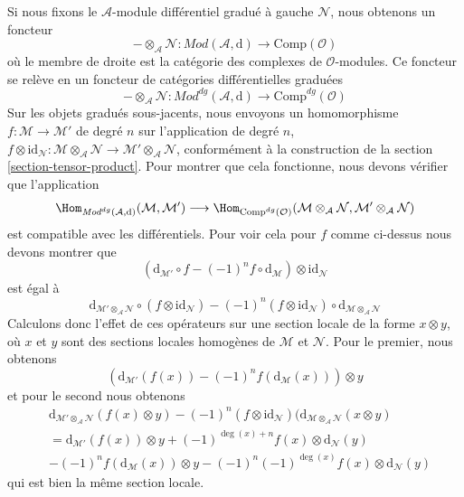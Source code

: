 \medskip\noindent
Si nous fixons le $\mathcal{A}$-module différentiel gradué à gauche $\mathcal{N}$,
nous obtenons un
foncteur $$
- \otimes_\mathcal{A} \mathcal{N}
: \textit{Mod}(\mathcal{A}, \text{d})
\longrightarrow
\text{Comp}(\mathcal{O})
$$
où le membre de droite est la catégorie des complexes de
$\mathcal{O}$-modules. Ce foncteur se relève en un foncteur de
catégories différentielles graduées
$$
- \otimes_\mathcal{A} \mathcal{N} :
\textit{Mod}^{dg}(\mathcal{A}, \text{d})
\longrightarrow
\text{Comp}^{dg}(\mathcal{O})
$$ Sur
les objets gradués sous-jacents, nous
envoyons un homomorphisme $f : \mathcal{M} \to \mathcal{M}'$ de degré $n$
sur l'application de degré $n$,
$f \otimes \text{id}_\mathcal{N}
: \mathcal{M} \otimes_\mathcal{A} \mathcal{N} \to
\mathcal{M}' \otimes_\mathcal{A} \mathcal{N}$,
conformément à la construction de la section \ref{section-tensor-product}.
Pour montrer que cela fonctionne, nous devons
vérifier que l'application $$
\Hom_{\textit{Mod}^{dg}(\mathcal{A}, \text{d})}(\mathcal{M}, \mathcal{M}')
\longrightarrow
\Hom_{\text{Comp}^{dg}(\mathcal{O})}(
\mathcal{M} \otimes_\mathcal{A} \mathcal{N},
\mathcal{M}' \otimes_\mathcal{A} \mathcal{N})
$$
est compatible avec les différentiels. Pour voir cela pour $f$
comme
ci-dessus nous devons montrer que $$
(\text{d}_{\mathcal{M}'} \circ f - (-1)^n f \circ \text{d}_\mathcal{M})
\otimes \text{id}_\mathcal{N}
$$
est
égal à $$
\text{d}_{\mathcal{M}' \otimes_\mathcal{A} \mathcal{N}}
\circ (f \otimes \text{id}_\mathcal{N})
- (-1)^n (f \otimes \text{id}_\mathcal{N}) \circ
\text{d}_{\mathcal{M} \otimes_\mathcal{A} \mathcal{N}}
$$
Calculons donc l'effet de ces opérateurs sur
une section locale de la forme $x \otimes y$, où $x$ et $y$ sont des sections
locales homogènes de $\mathcal{M}$ et $\mathcal{N}$. Pour le
premier, nous obtenons $$
(\text{d}_{\mathcal{M}'}(f(x)) - (-1)^n f(\text{d}_\mathcal{M}(x))) \otimes
y $$
et pour
le second nous obtenons \begin{align*}
&\text{d}_{\mathcal{M}' \otimes_\mathcal{A} \mathcal{N}}(f(x) \otimes
y) - (-1)^n (f \otimes \text{id}_\mathcal{N})(
\text{d}_{\mathcal{M} \otimes_\mathcal{A} \mathcal{N}}(x \otimes y) \\
&
= \text{d}_{\mathcal{M}'}(f(x)) \otimes
y + (-1)^{\deg(x) + n}f(x) \otimes \text{d}_\mathcal{N}(y) \\
&
-(-1)^n f(\text{d}_\mathcal{M}(x)) \otimes
y -(-1)^n (-1)^{\deg(x)}f(x) \otimes \text{d}_\mathcal{N}(y)
\end{align*}
qui est bien la même section locale.











